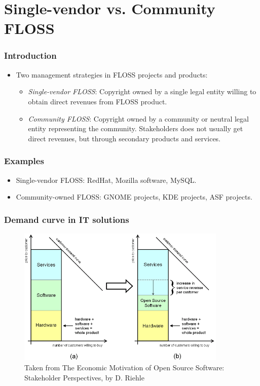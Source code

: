 
\section{Single-vendor vs. Community FLOSS}

\begin{frame}
\frametitle{Introduction}
\begin{itemize}
  \item Two management strategies in FLOSS projects and products:
  \begin{itemize}
   \item \textit{Single-vendor FLOSS}: Copyright owned by a single legal
entity willing to obtain direct revenues from FLOSS product.
   \item \textit{Community FLOSS}: Copyright owned by a community or
neutral legal entity representing the community. Stakeholders does not usually
get direct revenues, but through secondary products and services.
  \end{itemize}

  \end{itemize}
\end{frame}


\begin{frame}
\frametitle{Examples}
\begin{itemize}
  \item Single-vendor FLOSS: RedHat, Mozilla software, MySQL.
  \item Community-owned FLOSS: GNOME projects, KDE projects, ASF projects.
\end{itemize}
\end{frame}


\begin{frame}
\frametitle{Demand curve in IT solutions}

\begin{center}
  \begin{figure}
    \includegraphics[width=10cm]{figs/it-solutions-demand-curve.png}
    \caption{Taken from The Economic Motivation of Open Source Software: 
Stakeholder Perspectives, by D. Riehle} 
  \end{figure}
\end{center}

\end{frame}

